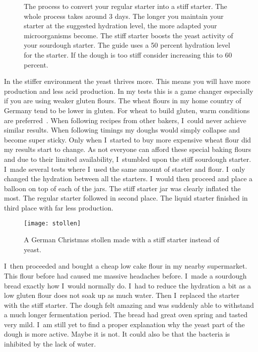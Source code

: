 \begin{figure}[!htb]
\begin{center}
  
  \caption{The process to convert your regular starter into a stiff starter. The whole
  process takes around 3 days. The longer you maintain your starter at the
  suggested hydration level, the more adapted your microorganisms become. The
  stiff starter boosts the yeast activity of your sourdough starter.
  The guide uses a 50 percent hydration level for the starter. If the dough is too stiff
  consider increasing this to 60 percent.}%
  \label{fig:stiff-starter-conversion}
\end{center}
\end{figure}

In the stiffer environment the yeast thrives more. This means you will have
more  production and less acid production. In my tests this is a game
changer especially if you are using weaker gluten flours. The wheat flours in
my home country of Germany tend to be lower in gluten. For wheat to build gluten, warm conditions
are preferred~\cite{gluten+development+temperatures}. When following recipes
from other bakers, I~could never achieve similar results. When following
timings my doughs would
simply collapse and become super sticky. Only when I~started to buy more
expensive wheat flour did my results start to change. As not everyone can afford
these special baking flours and due to their limited availability, I~stumbled upon the
stiff sourdough starter. I~made several tests where I~used the same amount of
starter and flour. I~only changed the hydration between all the starters.
I~would then proceed and place a balloon on top of each of the jars. The stiff
starter jar was clearly inflated the most. The regular starter
followed in second place. The liquid starter finished in third place with far less 
production.

\begin{figure}[!htb]
  \texttt{[image: stollen]}
  \caption{A German Christmas stollen made with a stiff starter instead of
  yeast.}%
  \label{fig:stollen}
\end{figure}

I~then proceeded and bought a cheap low cake flour in my nearby supermarket.
This flour before had caused me massive headaches before. I~made a sourdough bread
exactly how I~would normally do. I~had to reduce the hydration a bit as a low
gluten flour does not soak up as much water. Then I~replaced the starter with
the stiff starter. The dough felt amazing and was suddenly able to withstand a
much longer fermentation period. The bread had great oven spring and tasted
very mild. I~am still yet to find a proper explanation why the yeast part of
the dough is more active. Maybe it is not. It could also be that the bacteria
is inhibited by the lack of water.

